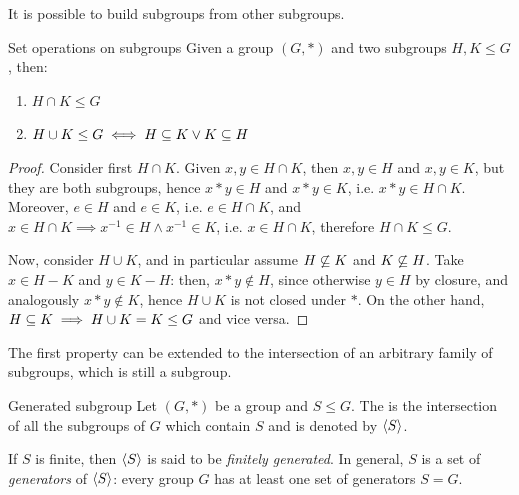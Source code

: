 It is possible to build subgroups from other subgroups.

\begin{proposition}{Set operations on subgroups}{}
  Given a group $ (G , *) $ and two subgroups $ H,K \leq G $, then:
  \begin{enumerate}
    \item $ H \cap K \leq G $
    \item $ H \cup K \leq G \iff H \subseteq K \lor K \subseteq H $
  \end{enumerate}
\end{proposition}

\begin{proofbox}
  \begin{proof}
    Consider first $ H \cap K $. Given $ x,y \in H \cap K $, then $ x,y \in H $ and $ x,y \in K $, but they are both subgroups, hence $ x * y \in H $ and $ x * y \in K $, i.e. $ x * y \in H \cap K $. Moreover, $ e \in H $ and $ e \in K $, i.e. $ e \in H \cap K $, and $ x \in H \cap K \implies x^{-1} \in H \land x^{-1} \in K $, i.e. $ x \in H \cap K $, therefore $ H \cap K \leq G $.

    Now, consider $ H \cup K $, and in particular assume $ H \not\subseteq K $ and $ K \not\subseteq H $. Take $ x \in H - K $ and $ y \in K - H $: then, $ x * y \notin H $, since otherwise $ y \in H $ by closure, and analogously $ x * y \notin K $, hence $ H \cup K $ is not closed under $ * $. On the other hand, $ H \subseteq K \implies H \cup K = K \leq G $ and vice versa.
  \end{proof}
\end{proofbox}

The first property can be extended to the intersection of an arbitrary family of subgroups, which is still a subgroup.

\begin{definition}{Generated subgroup}{}
  Let $ (G,*) $ be a group and $ S \leq G $. The  is the intersection of all the subgroups of $ G $ which contain $ S $ and is denoted by $ \braket{S} $.
\end{definition}

If $ S $ is finite, then $ \braket{S} $ is said to be \emph{finitely generated}. In general, $ S $ is a set of \emph{generators} of $ \braket{S} $: every group $ G $ has at least one set of generators $ S = G $.











